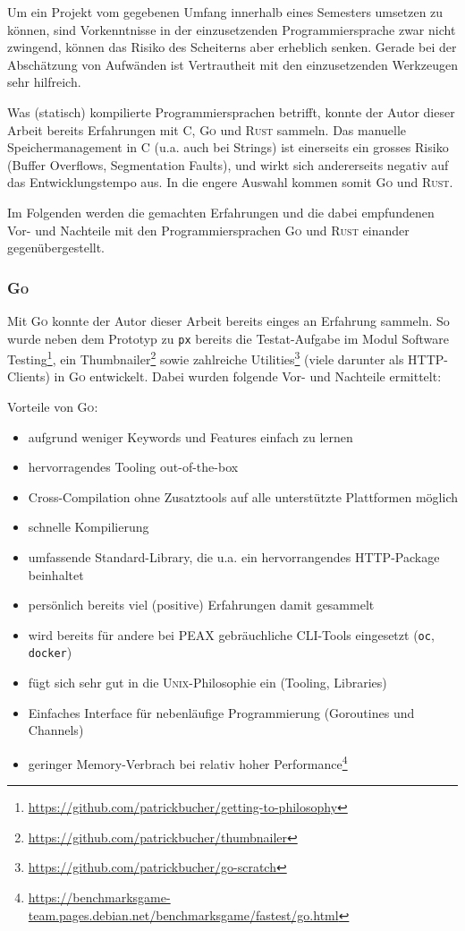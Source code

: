 Um ein Projekt vom gegebenen Umfang innerhalb eines Semesters umsetzen zu können, sind Vorkenntnisse in der einzusetzenden Programmiersprache zwar nicht zwingend, können das Risiko des Scheiterns aber erheblich senken. Gerade bei der Abschätzung von Aufwänden ist Vertrautheit mit den einzusetzenden Werkzeugen sehr hilfreich.

Was (statisch) kompilierte Programmiersprachen betrifft, konnte der Autor dieser Arbeit bereits Erfahrungen mit C, \textsc{Go} und \textsc{Rust} sammeln. Das manuelle Speichermanagement in C (u.a. auch bei Strings) ist einerseits ein grosses Risiko (Buffer Overflows, Segmentation Faults), und wirkt sich andererseits negativ auf das Entwicklungstempo aus. In die engere Auswahl kommen somit \textsc{Go} und \textsc{Rust}.

Im Folgenden werden die gemachten Erfahrungen und die dabei empfundenen Vor- und Nachteile mit den Programmiersprachen \textsc{Go} und \textsc{Rust} einander gegenübergestellt.

\subsubsection{\textsc{Go}}

Mit \textsc{Go} konnte der Autor dieser Arbeit bereits einges an Erfahrung sammeln. So wurde neben dem Prototyp zu \texttt{px} bereits die Testat-Aufgabe im Modul Software Testing\footnote{\url{https://github.com/patrickbucher/getting-to-philosophy}}, ein Thumbnailer\footnote{\url{https://github.com/patrickbucher/thumbnailer}} sowie zahlreiche Utilities\footnote{\url{https://github.com/patrickbucher/go-scratch}} (viele darunter als HTTP-Clients) in \textsc{Go} entwickelt. Dabei wurden folgende Vor- und Nachteile ermittelt:

Vorteile von \textsc{Go}:

\begin{itemize}
    \item aufgrund weniger Keywords und Features einfach zu lernen
    \item hervorragendes Tooling out-of-the-box
    \item Cross-Compilation ohne Zusatztools auf alle unterstützte Plattformen möglich
    \item schnelle Kompilierung
    \item umfassende Standard-Library, die u.a. ein hervorrangendes HTTP-Package beinhaltet
    \item persönlich bereits viel (positive) Erfahrungen damit gesammelt
    \item wird bereits für andere bei PEAX gebräuchliche CLI-Tools eingesetzt (\texttt{oc}, \texttt{docker})
    \item fügt sich sehr gut in die \textsc{Unix}-Philosophie ein (Tooling, Libraries)
    \item Einfaches Interface für nebenläufige Programmierung (Goroutines und Channels)
    \item geringer Memory-Verbrach bei relativ hoher Performance\footnote{\url{https://benchmarksgame-team.pages.debian.net/benchmarksgame/fastest/go.html}}
\end{itemize}

